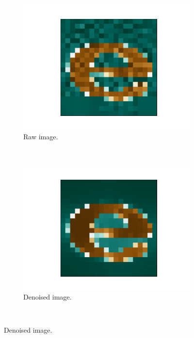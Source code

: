 \documentclass[../main.tex]{subfiles}
\begin{document}
\begin{figure}
    \centering
    \begin{subfigure}[b]{0.48\textwidth}
        \includegraphics[width=\textwidth]{figures/pp/raw}
        \caption{Raw image.}
        \label{fig:gull}
    \end{subfigure}
    ~ %
    \begin{subfigure}[b]{0.48\textwidth}
        \includegraphics[width=\textwidth]{figures/pp/denoise}
        \caption{Denoised image.}
        \label{fig:denoise}
    \end{subfigure}
    ~ %

\end{figure}
\end{document}
